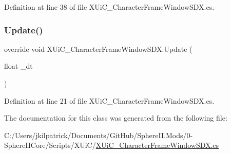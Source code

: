 Definition at line 38 of file X\+Ui\+C\+\_\+\+Character\+Frame\+Window\+S\+D\+X.\+cs.

\mbox{\label{class_x_ui_c___character_frame_window_s_d_x_a7bda15f5e5dca51a1f426a2893ca6a6d}} 
\subsubsection{\texorpdfstring{Update()}{Update()}}
{\footnotesize\ttfamily override void X\+Ui\+C\+\_\+\+Character\+Frame\+Window\+S\+D\+X.\+Update (\begin{DoxyParamCaption}\item[{float}]{\+\_\+dt }\end{DoxyParamCaption})}



Definition at line 21 of file X\+Ui\+C\+\_\+\+Character\+Frame\+Window\+S\+D\+X.\+cs.



The documentation for this class was generated from the following file\+:\begin{DoxyCompactItemize}
\item 
C\+:/\+Users/jkilpatrick/\+Documents/\+Git\+Hub/\+Sphere\+I\+I.\+Mods/0-\/\+Sphere\+I\+I\+Core/\+Scripts/\+X\+Ui\+C/\mbox{\hyperlink{_x_ui_c___character_frame_window_s_d_x_8cs}{X\+Ui\+C\+\_\+\+Character\+Frame\+Window\+S\+D\+X.\+cs}}\end{DoxyCompactItemize}
